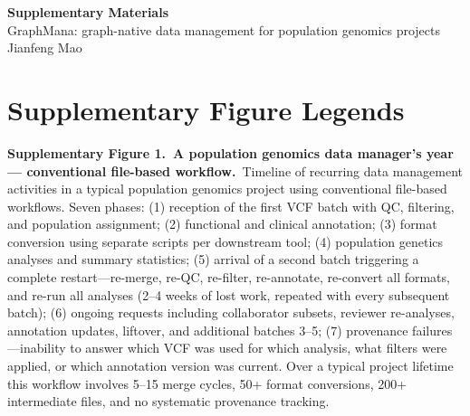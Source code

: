 \documentclass[11pt,a4paper]{article}
\begin{document}
\begin{center}
{\LARGE\bfseries\color{titleblue} Supplementary Materials}\\[6pt]
{\large GraphMana: graph-native data management for population genomics projects}\\[4pt]
{\normalsize Jianfeng Mao}
\end{center}

\tableofcontents
\newpage

\section{Supplementary Figure Legends}

\noindent\textbf{Supplementary Figure 1.~A population genomics data manager's year — conventional file-based workflow.}~Timeline of recurring data management activities in a typical population genomics project using conventional file-based workflows. Seven phases: (1) reception of the first VCF batch with QC, filtering, and population assignment; (2) functional and clinical annotation; (3) format conversion using separate scripts per downstream tool; (4) population genetics analyses and summary statistics; (5) arrival of a second batch triggering a complete restart---re-merge, re-QC, re-filter, re-annotate, re-convert all formats, and re-run all analyses (2--4 weeks of lost work, repeated with every subsequent batch); (6) ongoing requests including collaborator subsets, reviewer re-analyses, annotation updates, liftover, and additional batches 3--5; (7) provenance failures---inability to answer which VCF was used for which analysis, what filters were applied, or which annotation version was current. Over a typical project lifetime this workflow involves 5--15 merge cycles, 50+ format conversions, 200+ intermediate files, and no systematic provenance tracking.

\vspace{0.8em}
\end{document}
